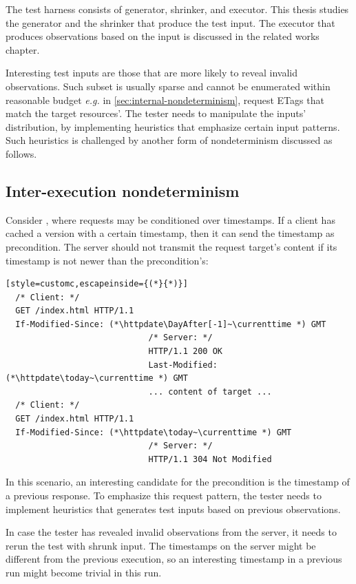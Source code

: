 The test harness consists of generator, shrinker, and executor.  This thesis
studies the generator and the shrinker that produce the test input.  The
executor that produces observations based on the input is discussed in the
related works chapter.

Interesting test inputs are those that are more likely to reveal invalid
observations.  Such subset is usually sparse and cannot be enumerated within
reasonable budget {\it e.g.} in \autoref{sec:internal-nondeterminism}, request
ETags that match the target resources'.  The tester needs to manipulate the
inputs' distribution, by implementing heuristics that emphasize certain input
patterns.  Such heuristics is challenged by another form of nondeterminism
discussed as follows.

\subsection{Inter-execution nondeterminism}
Consider \http, where requests may be conditioned over timestamps.  If a client
has cached a version with a certain timestamp, then it can send the timestamp as
 precondition.  The server should not transmit the
request target's content if its  timestamp is not newer
than the precondition's:
\begin{lstlisting}[style=customc,escapeinside={(*}{*)}]
  /* Client: */
  GET /index.html HTTP/1.1
  If-Modified-Since: (*\httpdate\DayAfter[-1]~\currenttime *) GMT
                             /* Server: */
                             HTTP/1.1 200 OK
                             Last-Modified: (*\httpdate\today~\currenttime *) GMT
                             ... content of target ...
  /* Client: */
  GET /index.html HTTP/1.1
  If-Modified-Since: (*\httpdate\today~\currenttime *) GMT
                             /* Server: */
                             HTTP/1.1 304 Not Modified
\end{lstlisting}
In this scenario, an interesting candidate for the 
precondition is the  timestamp of a previous response.
To emphasize this request pattern, the tester needs to implement heuristics that
generates test inputs based on previous observations.

In case the tester has revealed invalid observations from the server, it needs
to rerun the test with shrunk input.  The timestamps on the server might be
different from the previous execution, so an interesting timestamp in a previous
run might become trivial in this run.

